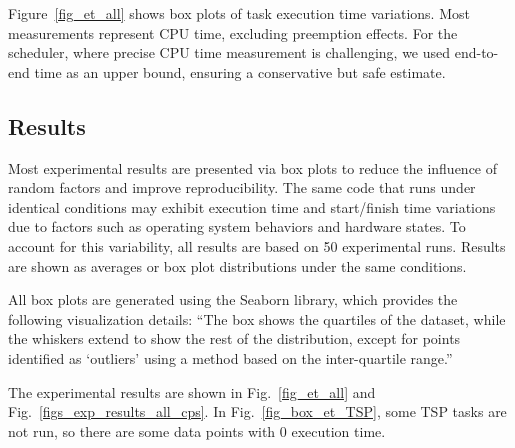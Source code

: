    
    Figure~\ref{fig_et_all} shows box plots of task execution time variations. Most measurements represent CPU time, excluding preemption effects. For the scheduler, where precise CPU time measurement is challenging, we used end-to-end time as an upper bound, ensuring a conservative but safe estimate.

	
\subsection{Results}
    Most experimental results are presented via box plots to reduce the influence of random factors and improve reproducibility. The same code that runs under identical conditions may exhibit execution time and start/finish time variations due to factors such as operating system behaviors and hardware states. To account for this variability, all results are based on 50 experimental runs. Results are shown as averages or box plot distributions under the same conditions.
    
    All box plots are generated using the Seaborn library, which provides the following visualization details:
    ``The box shows the quartiles of the dataset, while the whiskers extend to show the rest of the distribution, except for points identified as `outliers' using a method based on the inter-quartile range.''
    
    The experimental results are shown in Fig.~\ref{fig_et_all} and Fig.~\ref{figs_exp_results_all_cps}. In Fig.~\ref{fig_box_et_TSP}, some TSP tasks are not run, so there are some data points with 0 execution time. 

